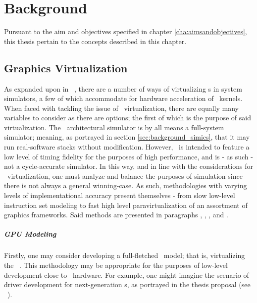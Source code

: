 
\chapter{Background}
\label{cha:background}
Pursuant to the aim and objectives specified in chapter \ref{cha:aimsandobjectives}, this thesis pertain to the concepts described in this chapter.

\section{Graphics Virtualization}
\label{sec:background_graphicsvirtualization}
As expanded upon in ~, there are a number of ways of virtualizing \dvttermgpu s in system simulators, a few of which accommodate for hardware acceleration of \dvttermgpu\ kernels.
When faced with tackling the issue of \dvttermgpu\ virtualization, there are equally many variables to consider as there are options; the first of which is the purpose of said virtualization.
The \dvttermsimics\ architectural simulator is by all means a full-system simulator; meaning, as portrayed in section \ref{sec:background_simics}, that it may run real-software stacks without modification.
However, \dvttermsimics\ is intended to feature a low level of timing fidelity for the purposes of high performance, and is - as such - not a cycle-accurate simulator.
In this way, and in line with the considerations for \dvttermgpu\ virtualization, one must analyze and balance the purposes of simulation since there is not always a general winning-case.
As such, methodologies with varying levels of implementational accuracy present themselves - from slow low-level instruction set modeling to fast high level paravirtualization of an assortment of graphics frameworks.
Said methods are presented in paragraphs , , , and .


\paragraph{GPU Modeling}
\label{par:background_graphicsvirtualization_gpumodeling}
Firstly, one may consider developing a full-fletched \dvttermgpu\ model; that is, virtualizing the \dvttermgpu\ \dvttermisa .
This methodology may be appropriate for the purposes of low-level development close to \dvttermgpu\ hardware.
For example, one might imagine the scenario of driver development for next-generation \dvttermgpu s, as portrayed in the thesis proposal (see ~).

